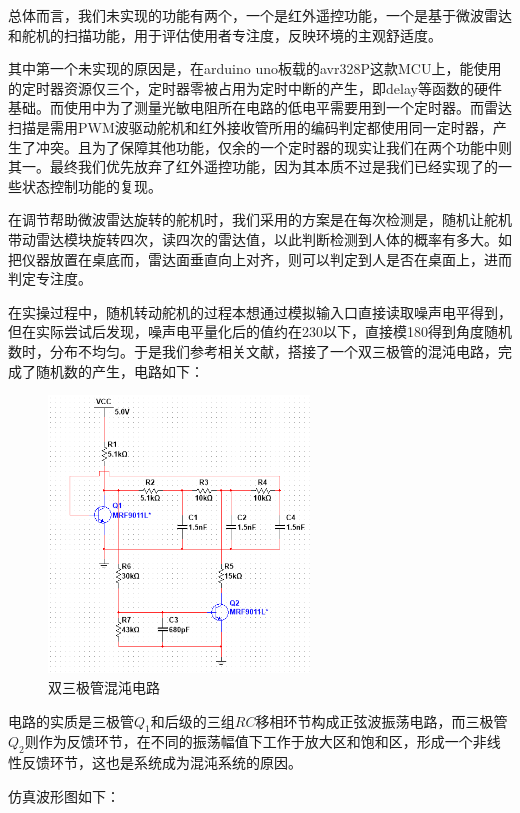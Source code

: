 \documentclass[a4paper, 11pt]{article} %
\begin{document}
总体而言，我们未实现的功能有两个，一个是红外遥控功能，一个是基于微波雷达和舵机的扫描功能，用于评估使用者专注度，反映环境的主观舒适度。

其中第一个未实现的原因是，在arduino uno板载的avr328P这款MCU上，能使用的定时器资源仅三个，定时器零被占用为定时中断的产生，即delay等函数的硬件基础。而使用中为了测量光敏电阻所在电路的低电平需要用到一个定时器。而雷达扫描是需用PWM波驱动舵机和红外接收管所用的编码判定都使用同一定时器，产生了冲突。且为了保障其他功能，仅余的一个定时器的现实让我们在两个功能中则其一。最终我们优先放弃了红外遥控功能，因为其本质不过是我们已经实现了的一些状态控制功能的复现。

在调节帮助微波雷达旋转的舵机时，我们采用的方案是在每次检测是，随机让舵机带动雷达模块旋转四次，读四次的雷达值，以此判断检测到人体的概率有多大。如把仪器放置在桌底而，雷达面垂直向上对齐，则可以判定到人是否在桌面上，进而判定专注度。

在实操过程中，随机转动舵机的过程本想通过模拟输入口直接读取噪声电平得到，但在实际尝试后发现，噪声电平量化后的值约在230以下，直接模180得到角度随机数时，分布不均匀。于是我们参考相关文献\cite{keuninckx_sande_danckaert_2015}，搭接了一个双三极管的混沌电路，完成了随机数的产生，电路如下：

\begin{figure}[H]
  \centering
  \includegraphics[width = 0.618\textwidth]{chaos.png}
  \caption{双三极管混沌电路}
\end{figure}

电路的实质是三极管$Q_1$和后级的三组$RC$移相环节构成正弦波振荡电路，而三极管$Q_2$则作为反馈环节，在不同的振荡幅值下工作于放大区和饱和区，形成一个非线性反馈环节，这也是系统成为混沌系统的原因。

仿真波形图如下：
\end{document}
